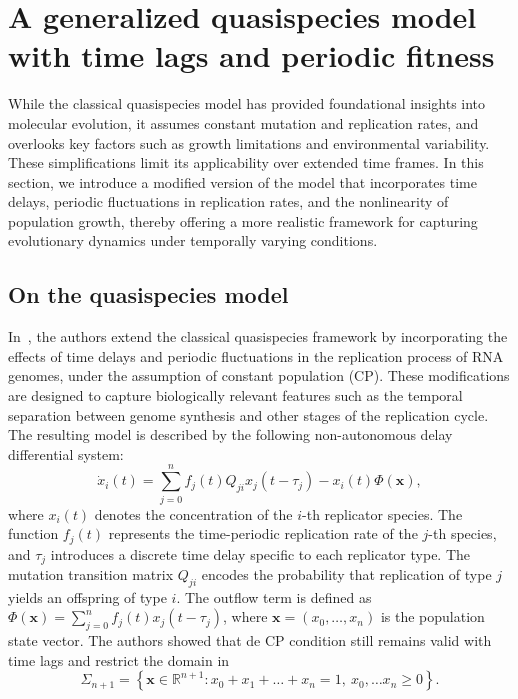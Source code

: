 \documentclass[11pt,reqno]{amsart}
\theoremstyle{definition}
\begin{document}
\section{A generalized quasispecies model with time lags and periodic fitness}\label{sec:model}
While the classical quasispecies model has provided foundational insights into molecular evolution, it assumes constant mutation and replication rates, and overlooks key factors such as growth limitations and environmental variability. These simplifications limit its applicability over extended time frames. In this section, we introduce a modified version of the model that incorporates time delays, periodic fluctuations in replication rates, and the nonlinearity of population growth, thereby offering a more realistic framework for capturing evolutionary dynamics under temporally varying conditions.

\subsection{On the quasispecies model} 
In~\cite{TurnerQuasi1}, the authors extend the classical quasispecies framework by incorporating the effects of time delays and periodic fluctuations in the replication process of RNA genomes, under the assumption of constant population (CP). These modifications are designed to capture biologically relevant features such as the temporal separation between genome synthesis and other stages of the replication cycle. The resulting model is described by the following non-autonomous delay differential system:
\begin{equation}\label{eq:QuasiDelay}
	\dot x_{i}(t)=\sum_{j=0}^n f_j(t)Q_{ji}x_j(t-\tau_j)-x_{i}(t)\Phi(\mathbf x), %
\end{equation}
where $x_i(t)$ denotes the concentration of the $i$-th replicator species. The function $f_j(t)$ represents the time-periodic replication rate of the $j$-th species, and $\tau_j$ introduces a discrete time delay specific to each replicator type. The mutation transition matrix $Q_{ji}$ encodes the probability that replication of type $j$ yields an offspring of type $i$. The outflow term is defined as $\Phi(\mathbf{x}) = \sum_{j=0}^n f_j(t)x_j(t - \tau_j)$, where $\mathbf{x} = (x_0, \dots, x_n)$ is the population state vector.
The authors showed that de CP condition still remains valid with time lags and restrict the domain in
\begin{equation}\label{eq:CP}
\Sigma_{n+1}=\left\{ \mathbf x\in\mathbb R^{n+1}:x_0+x_1+\dots+x_n=1,\ x_0,\dots x_n\geq0 \right\}.
\end{equation}
\end{document}

